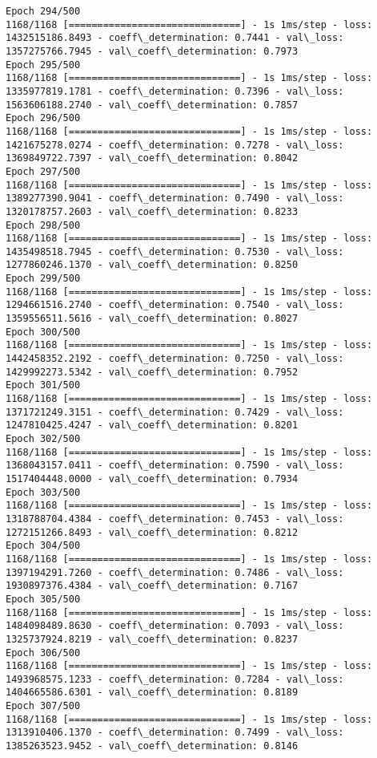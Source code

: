 \documentclass[11pt]{article}
\begin{document}
\begin{Verbatim}[commandchars=\\\{\}]
Epoch 294/500
1168/1168 [==============================] - 1s 1ms/step - loss: 1432515186.8493 - coeff\_determination: 0.7441 - val\_loss: 1357275766.7945 - val\_coeff\_determination: 0.7973
Epoch 295/500
1168/1168 [==============================] - 1s 1ms/step - loss: 1335977819.1781 - coeff\_determination: 0.7396 - val\_loss: 1563606188.2740 - val\_coeff\_determination: 0.7857
Epoch 296/500
1168/1168 [==============================] - 1s 1ms/step - loss: 1421675278.0274 - coeff\_determination: 0.7278 - val\_loss: 1369849722.7397 - val\_coeff\_determination: 0.8042
Epoch 297/500
1168/1168 [==============================] - 1s 1ms/step - loss: 1389277390.9041 - coeff\_determination: 0.7490 - val\_loss: 1320178757.2603 - val\_coeff\_determination: 0.8233
Epoch 298/500
1168/1168 [==============================] - 1s 1ms/step - loss: 1435498518.7945 - coeff\_determination: 0.7530 - val\_loss: 1277860246.1370 - val\_coeff\_determination: 0.8250
Epoch 299/500
1168/1168 [==============================] - 1s 1ms/step - loss: 1294661516.2740 - coeff\_determination: 0.7540 - val\_loss: 1359556511.5616 - val\_coeff\_determination: 0.8027
Epoch 300/500
1168/1168 [==============================] - 1s 1ms/step - loss: 1442458352.2192 - coeff\_determination: 0.7250 - val\_loss: 1429992273.5342 - val\_coeff\_determination: 0.7952
Epoch 301/500
1168/1168 [==============================] - 1s 1ms/step - loss: 1371721249.3151 - coeff\_determination: 0.7429 - val\_loss: 1247810425.4247 - val\_coeff\_determination: 0.8201
Epoch 302/500
1168/1168 [==============================] - 1s 1ms/step - loss: 1368043157.0411 - coeff\_determination: 0.7590 - val\_loss: 1517404448.0000 - val\_coeff\_determination: 0.7934
Epoch 303/500
1168/1168 [==============================] - 1s 1ms/step - loss: 1318788704.4384 - coeff\_determination: 0.7453 - val\_loss: 1272151266.8493 - val\_coeff\_determination: 0.8212
Epoch 304/500
1168/1168 [==============================] - 1s 1ms/step - loss: 1397194291.7260 - coeff\_determination: 0.7486 - val\_loss: 1930897376.4384 - val\_coeff\_determination: 0.7167
Epoch 305/500
1168/1168 [==============================] - 1s 1ms/step - loss: 1484098489.8630 - coeff\_determination: 0.7093 - val\_loss: 1325737924.8219 - val\_coeff\_determination: 0.8237
Epoch 306/500
1168/1168 [==============================] - 1s 1ms/step - loss: 1493968575.1233 - coeff\_determination: 0.7284 - val\_loss: 1404665586.6301 - val\_coeff\_determination: 0.8189
Epoch 307/500
1168/1168 [==============================] - 1s 1ms/step - loss: 1313910406.1370 - coeff\_determination: 0.7499 - val\_loss: 1385263523.9452 - val\_coeff\_determination: 0.8146

\end{Verbatim}
\end{document}
